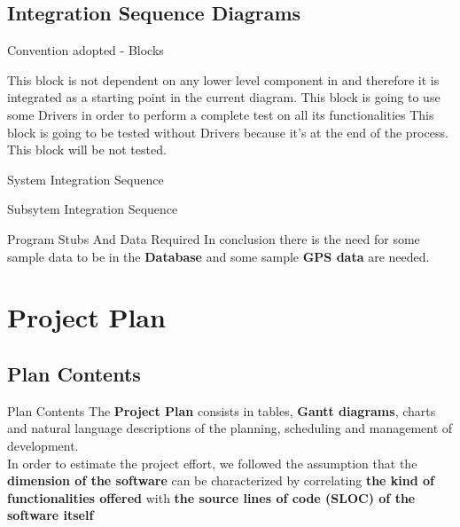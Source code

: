\documentclass{../Common/Structure/pdf_presentation}
\begin{document}
	\subsection{Integration Sequence Diagrams}
	\begin{frame}{Convention adopted - Blocks}
		\begin{itemize}
			 This block is not dependent on any lower level component in \PowerEnJoy{} and therefore it is integrated as a starting point in the current diagram.
			 This block is going to use some Drivers in order to perform a complete test on all its functionalities
			 This block is going to be tested without Drivers because it's at the end of the process.
				This block will be not tested.
		\end{itemize}
	\end{frame}
	\begin{frame}{System Integration Sequence}
	\end{frame}
	\begin{frame}{Subsytem Integration Sequence}
	\end{frame}
	\begin{frame}{Program Stubs And Data Required}
		In conclusion there is the need for some sample data to be in the \textbf{Database} and some sample \textbf{GPS data} are needed.
	\end{frame}
	\section{Project Plan}
	\subsection{Plan Contents}
	\begin{frame}{Plan Contents}
		The \textbf{Project Plan} consists in tables, \textbf{Gantt diagrams}, charts and natural language descriptions of the planning, scheduling and management of \PowerEnJoy{} development. \\
		\medskip
		In order to estimate the project effort, we followed the assumption that the \textbf{dimension of the software} can be characterized by correlating \textbf{the kind of functionalities offered} with \textbf{the source lines of code (SLOC) of the software itself}
	\end{frame}
\end{document}

